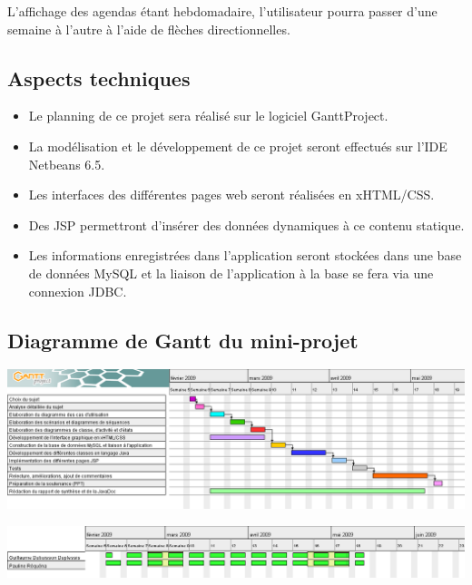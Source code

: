 \documentclass[12pt , a4paper]{article}
\begin{document}
L{\textquoteright}affichage des agendas \'etant hebdomadaire,
l{\textquoteright}utilisateur pourra passer d{\textquoteright}une
semaine \`a l{\textquoteright}autre \`a l{\textquoteright}aide de
fl\`eches directionnelles.

\subsection{Aspects techniques}

\begin{itemize}
\item Le planning de ce projet sera r\'ealis\'e sur le logiciel
  GanttProject.
\item La mod\'elisation et le d\'eveloppement de ce projet seront
  effectu\'es sur l{\textquoteright}IDE Netbeans 6.5.
\item Les interfaces des diff\'erentes pages web seront r\'ealis\'ees en
  xHTML/CSS.
\item Des JSP permettront d{\textquoteright}ins\'erer des donn\'ees
  dynamiques \`a ce contenu statique.
\item Les informations enregistr\'ees dans l{\textquoteright}application
  seront stock\'ees dans une base de donn\'ees MySQL et la liaison de
  l{\textquoteright}application \`a la base se fera via une connexion
  JDBC.
\end{itemize}

\subsection{Diagramme de Gantt du mini-projet}
	\begin{center}
	  \includegraphics[scale=0.4]{./images/planning_projet_JAVA.png}
	\end{center}
	\begin{center}
	  \includegraphics[scale=0.4]{./images/planning_projet_JAVA_res.png}
	\end{center}
\end{document}
